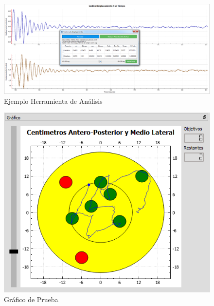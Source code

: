 \documentclass[12pt,a4paper]{article}
\begin{document}
\begin{figure}[H]
\centering
  \includegraphics[scale=0.3]{images/analisisGraficos}
  \caption{Ejemplo Herramienta de Análisis}
  \label{fig:analsisGraficos}
\end{figure}

\begin{figure}[H]
\centering
  \includegraphics[scale=0.7]{images/graficoPrincipal}
  \caption{Gráfico de Prueba}
  \label{fig:graficoPrincipal}
\end{figure}
\end{document}
